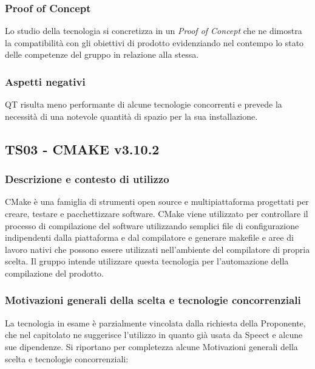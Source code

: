 \documentclass[./../Technology Baseline.tex]{subfiles}
\begin{document}
\subsubsection{Proof of Concept}
Lo studio della tecnologia si concretizza in un \textit{Proof of Concept} che ne dimostra la compatibilità con gli obiettivi di prodotto evidenziando nel contempo lo stato delle competenze del gruppo in relazione alla stessa.

\subsubsection{Aspetti negativi}
QT risulta meno performante di alcune tecnologie concorrenti e prevede la necessità di una notevole quantità di spazio per la sua installazione.

\subsection{TS03 - CMAKE v3.10.2}

\subsubsection{Descrizione e contesto di utilizzo}
CMake è una famiglia di strumenti open source e multipiattaforma progettati per creare, testare e pacchettizzare software. CMake viene utilizzato per controllare il processo di compilazione del software utilizzando semplici file di configurazione indipendenti dalla piattaforma e dal compilatore e generare makefile e aree di lavoro nativi che possono essere utilizzati nell'ambiente del compilatore di propria scelta. Il gruppo intende utilizzare questa tecnologia per l’automazione della compilazione del prodotto.

\subsubsection{Motivazioni generali della scelta e tecnologie concorrenziali}
La tecnologia in esame è parzialmente vincolata dalla richiesta della Proponente, che nel capitolato ne suggerisce l'utilizzo in quanto già
usata da Speect e alcune sue dipendenze. Si riportano per completezza alcune Motivazioni generali della scelta e tecnologie concorrenziali:
\end{document}
